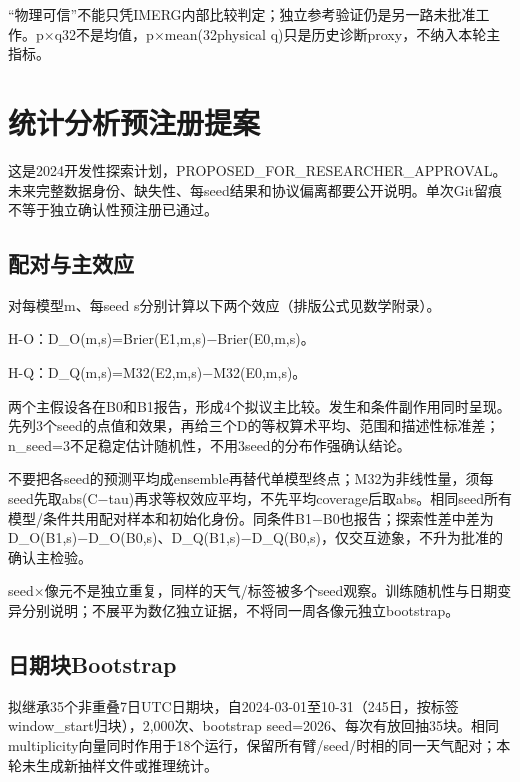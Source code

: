 \documentclass[UTF8,fontset=fandol,10pt]{ctexart}
\begin{document}
“物理可信”不能只凭IMERG内部比较判定；独立参考验证仍是另一路未批准工作。p\(\times\)q32不是均值，p\(\times\)mean(32physical q)只是历史诊断proxy，不纳入本轮主指标。
\clearpage\section{统计分析预注册提案}

这是2024开发性探索计划，PROPOSED\_\allowbreak{}FOR\_\allowbreak{}RESEARCHER\_\allowbreak{}APPROVAL。未来完整数据身份、缺失性、每seed结果和协议偏离都要公开说明。单次Git留痕不等于独立确认性预注册已通过。

\subsection{配对与主效应}

对每模型m、每seed s分别计算以下两个效应（排版公式见数学附录）。

H-O：D\_\allowbreak{}O(m,s)=Brier(E1,m,s)\(-\)Brier(E0,m,s)。

H-Q：D\_\allowbreak{}Q(m,s)=M32(E2,m,s)\(-\)M32(E0,m,s)。

两个主假设各在B0和B1报告，形成4个拟议主比较。发生和条件副作用同时呈现。先列3个seed的点值和效果，再给三个D的等权算术平均、范围和描述性标准差；n\_\allowbreak{}seed=3不足稳定估计随机性，不用3seed的分布作强确认结论。

不要把各seed的预测平均成ensemble再替代单模型终点；M32为非线性量，须每seed先取abs(C\(-\)tau)再求等权效应平均，不先平均coverage后取abs。相同seed所有模型/\allowbreak{}条件共用配对样本和初始化身份。同条件B1\(-\)B0也报告；探索性差中差为D\_\allowbreak{}O(B1,s)\(-\)D\_\allowbreak{}O(B0,s)、D\_\allowbreak{}Q(B1,s)\(-\)D\_\allowbreak{}Q(B0,s)，仅交互迹象，不升为批准的确认主检验。

seed\(\times\)像元不是独立重复，同样的天气/\allowbreak{}标签被多个seed观察。训练随机性与日期变异分别说明；不展平为数亿独立证据，不将同一周各像元独立bootstrap。

\subsection{日期块Bootstrap}

拟继承35个非重叠7日UTC日期块，自2024-03-01至10-31（245日，按标签window\_\allowbreak{}start归块），2,000次、bootstrap seed=2026、每次有放回抽35块。相同multiplicity向量同时作用于18个运行，保留所有臂/\allowbreak{}seed/\allowbreak{}时相的同一天气配对；本轮未生成新抽样文件或推理统计。
\end{document}
